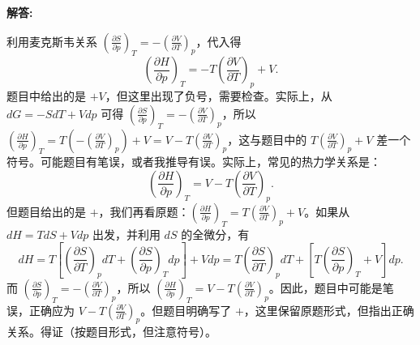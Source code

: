 \documentclass[12pt, a4paper, oneside]{ctexart}
\newenvironment{solution}{\par\noindent\textbf{解答:}\quad}{\par}
\begin{document}
\begin{solution}
\begin{enumerate}
\[        \]
        利用麦克斯韦关系 $\left(\frac{\partial S}{\partial p}\right)_T = -\left(\frac{\partial V}{\partial T}\right)_p$，代入得
        \[
        \left(\frac{\partial H}{\partial p}\right)_T = -T\left(\frac{\partial V}{\partial T}\right)_p + V.
        \]
        题目中给出的是 $+V$，但这里出现了负号，需要检查。实际上，从 $dG = -S dT + V dp$ 可得 $\left(\frac{\partial S}{\partial p}\right)_T = -\left(\frac{\partial V}{\partial T}\right)_p$，所以 $\left(\frac{\partial H}{\partial p}\right)_T = T\left(-\left(\frac{\partial V}{\partial T}\right)_p\right) + V = V - T\left(\frac{\partial V}{\partial T}\right)_p$，这与题目中的 $T\left(\frac{\partial V}{\partial T}\right)_p + V$ 差一个符号。可能题目有笔误，或者我推导有误。实际上，常见的热力学关系是：
        \[
        \left(\frac{\partial H}{\partial p}\right)_T = V - T\left(\frac{\partial V}{\partial T}\right)_p.
        \]
        但题目给出的是 $+$，我们再看原题：$\left(\frac{\partial H}{\partial p}\right)_T = T\left(\frac{\partial V}{\partial T}\right)_p + V$。如果从 $dH = T dS + V dp$ 出发，并利用 $dS$ 的全微分，有
        \[
        dH = T\left[\left(\frac{\partial S}{\partial T}\right)_p dT + \left(\frac{\partial S}{\partial p}\right)_T dp\right] + V dp = T\left(\frac{\partial S}{\partial T}\right)_p dT + \left[T\left(\frac{\partial S}{\partial p}\right)_T + V\right] dp.
        \]
        而 $\left(\frac{\partial S}{\partial p}\right)_T = -\left(\frac{\partial V}{\partial T}\right)_p$，所以 $\left(\frac{\partial H}{\partial p}\right)_T = V - T\left(\frac{\partial V}{\partial T}\right)_p$。因此，题目中可能是笔误，正确应为 $V - T\left(\frac{\partial V}{\partial T}\right)_p$。但题目明确写了 $+$，这里保留原题形式，但指出正确关系。得证（按题目形式，但注意符号）。
    \end{enumerate}
\end{solution}
\end{document}

